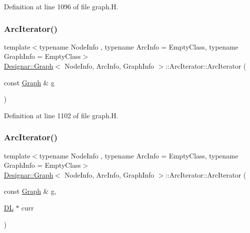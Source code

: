 Definition at line 1096 of file graph.\+H.

\mbox{\label{class_designar_1_1_graph_1_1_arc_iterator_afeb58fdc5c6d4fd2d57c2ce53969203e}} 
\subsubsection{\texorpdfstring{Arc\+Iterator()}{ArcIterator()}\hspace{0.1cm}{\footnotesize\ttfamily [2/5]}}
{\footnotesize\ttfamily template$<$typename Node\+Info , typename Arc\+Info  = Empty\+Class, typename Graph\+Info  = Empty\+Class$>$ \\
\hyperlink{class_designar_1_1_graph}{Designar\+::\+Graph}$<$ Node\+Info, Arc\+Info, Graph\+Info $>$\+::Arc\+Iterator\+::\+Arc\+Iterator (\begin{DoxyParamCaption}\item[{const \hyperlink{class_designar_1_1_graph}{Graph} \&}]{g }\end{DoxyParamCaption})\hspace{0.3cm}{\ttfamily [inline]}}



Definition at line 1102 of file graph.\+H.

\mbox{\label{class_designar_1_1_graph_1_1_arc_iterator_a2a9eb9d16ff5d80a22671dfdbe9ce3a2}} 
\subsubsection{\texorpdfstring{Arc\+Iterator()}{ArcIterator()}\hspace{0.1cm}{\footnotesize\ttfamily [3/5]}}
{\footnotesize\ttfamily template$<$typename Node\+Info , typename Arc\+Info  = Empty\+Class, typename Graph\+Info  = Empty\+Class$>$ \\
\hyperlink{class_designar_1_1_graph}{Designar\+::\+Graph}$<$ Node\+Info, Arc\+Info, Graph\+Info $>$\+::Arc\+Iterator\+::\+Arc\+Iterator (\begin{DoxyParamCaption}\item[{const \hyperlink{class_designar_1_1_graph}{Graph} \&}]{g,  }\item[{\hyperlink{class_designar_1_1_d_l}{DL} $\ast$}]{curr }\end{DoxyParamCaption})\hspace{0.3cm}{\ttfamily [inline]}}



